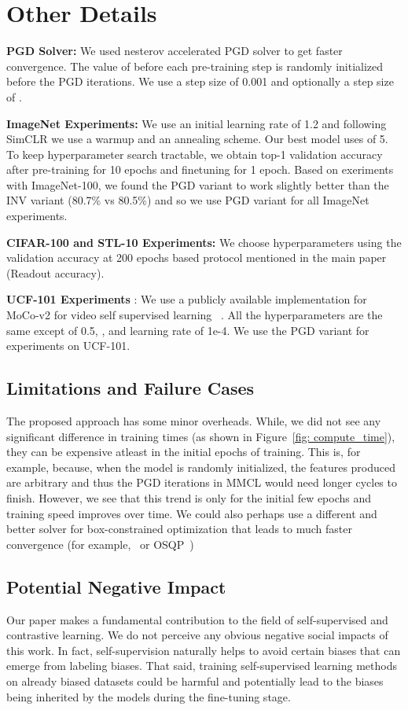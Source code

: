 \documentclass[letterpaper]{article} \usepackage{aaai22}  \usepackage{times}  \usepackage{helvet}  \usepackage{courier}  \usepackage[hyphens]{url}  \usepackage{graphicx} \urlstyle{rm} \def\UrlFont{\rm}  \usepackage{natbib}  \usepackage{caption} \DeclareCaptionStyle{ruled}{labelfont=normalfont,labelsep=colon,strut=off} \frenchspacing  \setlength{\pdfpagewidth}{8.5in}  \setlength{\pdfpageheight}{11in}
\begin{document}
\section{Other Details}
\noindent\textbf{PGD Solver:} We used nesterov accelerated PGD solver to get faster convergence. The value of  before each pre-training step is randomly initialized before the PGD iterations. We use a step size of 0.001 and optionally a step size of .

\noindent\textbf{ImageNet Experiments:} We use an initial learning rate of 1.2 and following SimCLR we use a warmup and an annealing scheme. Our best model uses  of 5. To keep hyperparameter search tractable, we obtain top-1 validation accuracy after pre-training for 10 epochs and finetuning for 1 epoch. Based on exeriments with ImageNet-100, we found the PGD variant to work slightly better than the INV variant (80.7\% vs 80.5\%) and so we use PGD variant for all ImageNet experiments. 

\noindent\textbf{CIFAR-100 and STL-10 Experiments:} We choose hyperparameters using the validation accuracy at 200 epochs based protocol mentioned in the main paper (Readout accuracy).

\noindent\textbf{UCF-101 Experiments} : We use a publicly available implementation for MoCo-v2 for video self supervised learning ~\cite{NEURIPS2020_3def184a}. All the hyperparameters are the same except  of 0.5, , and learning rate of 1e-4. We use the PGD variant for experiments on UCF-101. 

\subsection{Limitations and Failure Cases}
The proposed approach has some minor overheads. While, we did not see any significant difference in training times (as shown in Figure~\ref{fig: compute_time}), they can be expensive atleast in the initial epochs of training. This is, for example, because, when the model is randomly initialized, the features produced are arbitrary and thus the PGD iterations in MMCL would need longer cycles to finish. However, we see that this trend is only for the initial few epochs and training speed improves over time. We could also perhaps use a different and better solver for box-constrained optimization that leads to much faster convergence (for example,~\cite{kiSrDh12} or OSQP~\cite{osqp-gpu})

\subsection{Potential Negative Impact}
Our paper makes a fundamental contribution to the field of self-supervised and contrastive learning. We do not perceive any obvious negative social impacts of this work. In fact, self-supervision naturally helps to avoid certain biases that can emerge from labeling biases. That said, training self-supervised learning methods on already biased datasets could be harmful and potentially lead to the biases being inherited by the models during the fine-tuning stage. 



\end{document}
